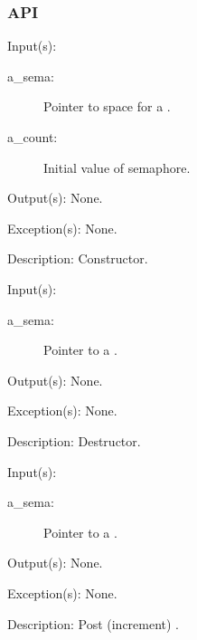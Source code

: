 \subsubsection{API}
\begin{capi}
\label{sema_new}
	\begin{capilist}
	\item[Input(s): ]
		\begin{description}\item[]
		\item[a\_sema: ]
			Pointer to space for a .
		\item[a\_count: ]
			Initial value of semaphore.
		\end{description}
	\item[Output(s): ] None.
	\item[Exception(s): ] None.
	\item[Description: ]
		Constructor.
	\end{capilist}
\label{sema_delete}
	\begin{capilist}
	\item[Input(s): ]
		\begin{description}\item[]
		\item[a\_sema: ]
			Pointer to a \classname{sema}.
		\end{description}
	\item[Output(s): ] None.
	\item[Exception(s): ] None.
	\item[Description: ]
		Destructor.
	\end{capilist}
\label{sema_post}
	\begin{capilist}
	\item[Input(s): ]
		\begin{description}\item[]
		\item[a\_sema: ]
			Pointer to a .
		\end{description}
	\item[Output(s): ] None.
	\item[Exception(s): ] None.
	\item[Description: ]
		Post (increment) \cvar{a\_sema}.

\end{capilist}
\end{capi}
